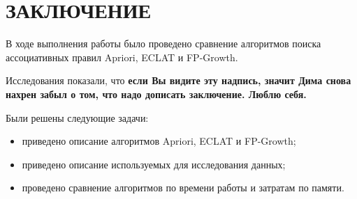 \section*{ЗАКЛЮЧЕНИЕ}
В ходе выполнения работы было проведено сравнение алгоритмов поиска ассоциативных правил Apriori, ECLAT и FP-Growth.

Исследования показали, что \textbf{если Вы видите эту надпись, значит Дима снова нахрен забыл о том, что надо дописать заключение. Люблю себя.}

Были решены следующие задачи:
\begin{itemize}
	\item приведено описание алгоритмов Apriori, ECLAT и FP-Growth;
	\item приведено описание используемых для исследования данных;
	\item проведено сравнение алгоритмов по времени работы и затратам по памяти.
\end{itemize}

\pagebreak